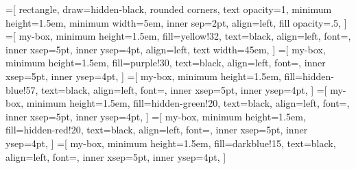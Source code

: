 =[
rectangle,
draw=hidden-black,
rounded corners,
text opacity=1,
minimum height=1.5em,
minimum width=5em,
inner sep=2pt,
align=left,
fill opacity=.5,
]
=[
my-box,
minimum height=1.5em,
fill=yellow!32,
text=black,
align=left,
font=\normalsize,
inner xsep=5pt,
inner ysep=4pt,
align=left,
text width=45em,
]
=[
my-box,
minimum height=1.5em,
fill=purple!30,
text=black,
align=left,
font=\normalsize,
inner xsep=5pt,
inner ysep=4pt,
]
=[
my-box,
minimum height=1.5em,
fill=hidden-blue!57,
text=black,
align=left,
font=\normalsize,
inner xsep=5pt,
inner ysep=4pt,
]
=[
my-box,
minimum height=1.5em,
fill=hidden-green!20,
text=black,
align=left,
font=\normalsize,
inner xsep=5pt,
inner ysep=4pt,
]
=[
my-box,
minimum height=1.5em,
fill=hidden-red!20,
text=black,
align=left,
font=\normalsize,
inner xsep=5pt,
inner ysep=4pt,
]
=[
my-box,
minimum height=1.5em,
fill=darkblue!15,
text=black,
align=left,
font=\normalsize,
inner xsep=5pt,
inner ysep=4pt,
]
